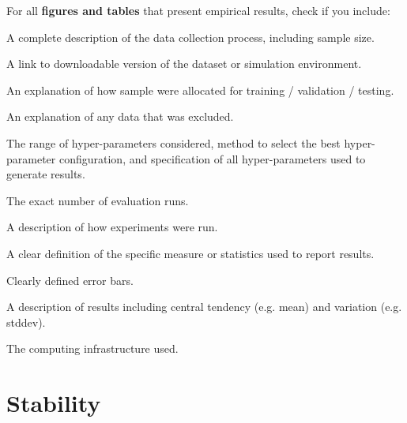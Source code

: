 For all \textbf{figures and tables} that present empirical results, check if you include:
\begin{todolist}
	\item A complete description of the data collection process, including sample size.
	\item A link to downloadable version of the dataset or simulation environment.
	\item An explanation of how sample were allocated for training / validation / testing.
	\item An explanation of any data that was excluded.
	\item The range of hyper-parameters considered, method to select the best hyper-parameter configuration, and specification of all hyper-parameters used to generate results.
	\item The exact number of evaluation runs.
	\item A description of how experiments were run.
	\item A clear definition of the specific measure or statistics used to report results.
	\item Clearly defined error bars.
	\item A description of results including central tendency (e.g. mean) and variation (e.g. stddev).
	\item The computing infrastructure used.
\end{todolist}


\section{Stability}
